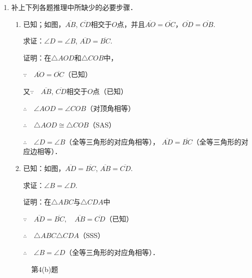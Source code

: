 \begin{enumerate}
\item 补上下列各题推理中所缺少的必要步骤．
\begin{enumerate}
	\item 已知；如图，$\overline{AB}$, $\overline{CD}$相交于$O$点，并且$\overline{AO}=\overline{OC}$，$\overline{OD}=\overline{OB}$.

求证：$\angle D=\angle B$, $\overline{AD}=\overline{BC}$.

证明：在$\triangle AOD$和$\triangle COB$中，

$\because\quad \overline{AO}=\overline{OC}$（已知）

又$\because\quad \overline{AB}$, $\overline{CD}$相交于$O$点（已知）

$\therefore\quad \angle AOD=\angle COB$（对顶角相等）

$\therefore\quad \triangle AOD\cong \triangle COB$（SAS）

$\therefore\quad \angle D=\angle B$（全等三角形的对应角相等），
$\overline{AD}=\overline{BC}$（全等三角形的对应边相等）．

\item 已知：如图，$\overline{AD}=\overline{BC}$, $\overline{AB}=\overline{CD}$.

求证：$\angle B=\angle D$.

证明：在$\triangle ABC$与$\triangle CDA$中

$\because\quad \overline{AD}=\overline{BC},\quad \overline{AB}=\overline{CD}$（已知）

$\therefore\quad \triangle ABC\triangle CDA$（SSS）

$\therefore\quad \angle B=\angle D$（全等三角形的对应角相等）．


\end{enumerate}

\begin{figure}[htp]\centering
    \begin{minipage}[t]{0.48\textwidth}
    \centering
{}
    \caption*{第4(b)题}
    \end{minipage}
    \begin{minipage}[t]{0.48\textwidth}
    \centering
\end{minipage}
\end{figure}
\end{enumerate}
